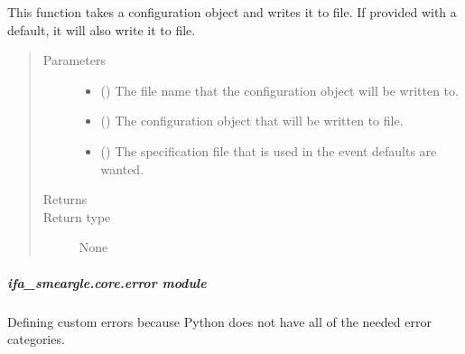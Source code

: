 \documentclass[letterpaper,10pt,english]{sphinxmanual}
\begin{document}
\begin{fulllineitems}
\label{\detokenize{docstrings/ifa_smeargle.core.configuration:ifa_smeargle.core.configuration.write_configuration_file}}
This function takes a configuration object and writes it to
file. If provided with a default, it will also write it to file.
\begin{quote}\begin{description}
\item[{Parameters}] \leavevmode\begin{itemize}
\item {} 
 () \textendash{} The file name that the configuration object will be
written to.

\item {} 
 () \textendash{} The configuration object that will be written to file.

\item {} 
 (\sphinxstyleliteralemphasis{\sphinxupquote{ (}}\sphinxstyleliteralemphasis{\sphinxupquote{)}}) \textendash{} The specification file that is used in the event defaults
are wanted.

\end{itemize}

\item[{Returns}] \leavevmode


\item[{Return type}] \leavevmode
None

\end{description}\end{quote}

\end{fulllineitems}



\subparagraph{ifa\_smeargle.core.error module}
\label{\detokenize{docstrings/ifa_smeargle.core.error:module-ifa_smeargle.core.error}}\label{\detokenize{docstrings/ifa_smeargle.core.error:ifa-smeargle-core-error-module}}\label{\detokenize{docstrings/ifa_smeargle.core.error::doc}}
Defining custom errors because Python does not have all of the
needed error categories.
\end{document}
